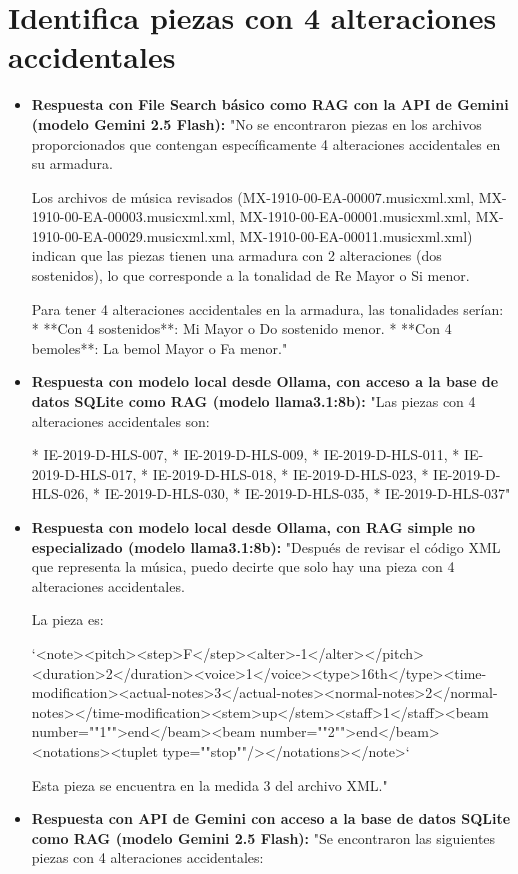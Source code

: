 \section{Identifica piezas con 4 alteraciones accidentales}
\begin{itemize}
    \item \textbf{Respuesta con File Search básico como RAG con la API de Gemini (modelo Gemini 2.5 Flash):} "No se encontraron piezas en los archivos proporcionados que contengan específicamente 4 alteraciones accidentales en su armadura.

Los archivos de música revisados (MX-1910-00-EA-00007.musicxml.xml, MX-1910-00-EA-00003.musicxml.xml, MX-1910-00-EA-00001.musicxml.xml, MX-1910-00-EA-00029.musicxml.xml, MX-1910-00-EA-00011.musicxml.xml) indican que las piezas tienen una armadura con 2 alteraciones (dos sostenidos), lo que corresponde a la tonalidad de Re Mayor o Si menor.

Para tener 4 alteraciones accidentales en la armadura, las tonalidades serían:
*   **Con 4 sostenidos**: Mi Mayor o Do sostenido menor.
*   **Con 4 bemoles**: La bemol Mayor o Fa menor."
    \item \textbf{Respuesta con modelo local desde Ollama, con acceso a la base de datos SQLite como RAG (modelo llama3.1:8b):} "Las piezas con 4 alteraciones accidentales son:

* IE-2019-D-HLS-007,
* IE-2019-D-HLS-009,
* IE-2019-D-HLS-011,
* IE-2019-D-HLS-017,
* IE-2019-D-HLS-018,
* IE-2019-D-HLS-023,
* IE-2019-D-HLS-026,
* IE-2019-D-HLS-030,
* IE-2019-D-HLS-035,
* IE-2019-D-HLS-037"
\item \textbf{Respuesta con modelo local desde Ollama, con RAG simple no especializado (modelo llama3.1:8b):} "Después de revisar el código XML que representa la música, puedo decirte que solo hay una pieza con 4 alteraciones accidentales. 

La pieza es:

 `<note><pitch><step>F</step><alter>-1</alter></pitch><duration>2</duration><voice>1</voice><type>16th</type><time-modification><actual-notes>3</actual-notes><normal-notes>2</normal-notes></time-modification><stem>up</stem><staff>1</staff><beam number=""1"">end</beam><beam number=""2"">end</beam><notations><tuplet type=""stop""/></notations></note>`

Esta pieza se encuentra en la medida 3 del archivo XML."
\item \textbf{Respuesta con API de Gemini con acceso a la base de datos SQLite como RAG (modelo Gemini 2.5 Flash):} "Se encontraron las siguientes piezas con 4 alteraciones accidentales:


\end{itemize}
